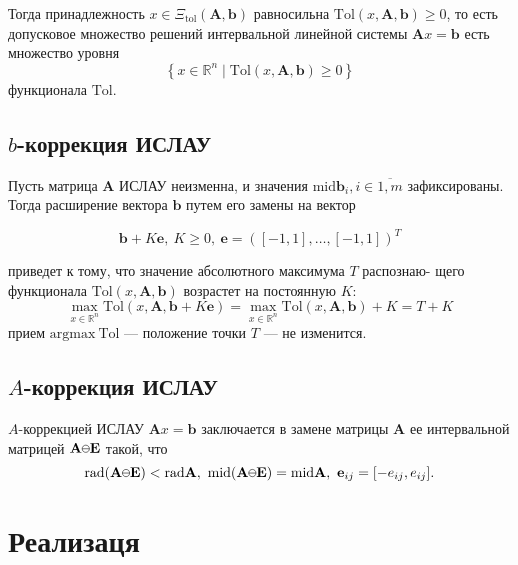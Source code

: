 \documentclass{article}
\newcommand{\kaucher}{
  \begin{tikzpicture}
    \draw (0, 0) circle (0.6ex);
    \draw (-0.6ex, 0) -- (0.6ex, 0);
  \end{tikzpicture}%
}
\begin{document}
  Тогда принадлежность \( x \in \Xi_{\text{tol}} (\mathbf{A}, \mathbf{b}) \)
  равносильна \( \text{Tol} (x, \mathbf{A}, \mathbf{b}) \geq 0 \), то есть
  допусковое множество решений интервальной линейной системы
  \( \mathbf{A} x = \mathbf{b} \) есть множество уровня
  \[
    \left \{ x \in \mathbb{R}^n \mid \text{Tol} (x, \mathbf{A}, \mathbf{b}) \geq 0 \right \}
  \]
  функционала \( \text{Tol} \).

  \vspace{\baselineskip}

  \subsection{\( b \)-коррекция ИСЛАУ}

  Пусть матрица \( \mathbf{A} \) ИСЛАУ неизменна, и значения
  \( \text{mid} \mathbf{b}_i, i \in \overline{1,m} \) зафиксированы. Тогда
  расширение вектора \( \mathbf{b} \) путем его замены на вектор

  \begin{equation} \label{eq:b-correction}
    \mathbf{b} + K\mathbf{e}, \ K \ge 0, \ \mathbf{e} = ([-1, 1], \dots, [-1, 1])^T
  \end{equation}

  приведет к тому, что значение абсолютного максимума \( T \) распознаю-
  щего функционала \( \text{Tol} (x, \mathbf{A}, \mathbf{b}) \) возрастет на
  постоянную \( K \):
  \[
    \max_{x \in \mathbb{R}^n} \text{Tol} (x, \mathbf{A}, \mathbf{b} + K \mathbf{e})
      = \max_{x \in \mathbb{R}^n} \text{Tol} (x, \mathbf{A}, \mathbf{b}) + K = T + K
  \]
  прием \( \text{argmax} \ \text{Tol} \) — положение точки \( T \) ---
  не изменится.

  \subsection{\( A \)-коррекция ИСЛАУ}

  \( A \)-коррекцией ИСЛАУ \( \mathbf{A}x = \mathbf{b} \) заключается
  в замене матрицы \( \mathbf{A} \) ее интервальной матрицей
  \( \mathbf{A} \kaucher \mathbf{E} \) такой, что
  \[
    \text{rad} (\mathbf{A} \kaucher \mathbf{E}) < \text{rad} \mathbf{A}, \
    \text{mid} (\mathbf{A} \kaucher \mathbf{E}) = \text{mid} \mathbf{A}, \
    \mathbf{e}_{ij} = [-e_{ij}, e_{ij}].
  \]

  \section{Реализаця}
\end{document}
